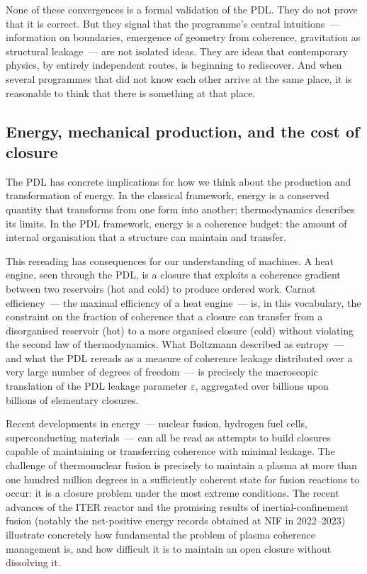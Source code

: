 \documentclass[12pt, a4paper, openright]{book}
\begin{document}
\medskip

None of these convergences is a formal validation of the PDL. They do not prove that it is correct. But they signal that the programme's central intuitions~--- information on boundaries, emergence of geometry from coherence, gravitation as structural leakage~--- are not isolated ideas. They are ideas that contemporary physics, by entirely independent routes, is beginning to rediscover. And when several programmes that did not know each other arrive at the same place, it is reasonable to think that there is something at that place.

\subsection*{Energy, mechanical production, and the cost of closure}

The PDL has concrete implications for how we think about the production and transformation of energy. In the classical framework, energy is a conserved quantity that transforms from one form into another; thermodynamics describes its limits. In the PDL framework, energy is a coherence budget: the amount of internal organisation that a structure can maintain and transfer.

\medskip

This rereading has consequences for our understanding of machines. A heat engine, seen through the PDL, is a closure that exploits a coherence gradient between two reservoirs (hot and cold) to produce ordered work. Carnot efficiency~--- the maximal efficiency of a heat engine~--- is, in this vocabulary, the constraint on the fraction of coherence that a closure can transfer from a disorganised reservoir (hot) to a more organised closure (cold) without violating the second law of thermodynamics. What Boltzmann described as entropy~--- and what the PDL rereads as a measure of coherence leakage distributed over a very large number of degrees of freedom~--- is precisely the macroscopic translation of the PDL leakage parameter $\varepsilon$, aggregated over billions upon billions of elementary closures.

\medskip

Recent developments in energy~--- nuclear fusion, hydrogen fuel cells, superconducting materials~--- can all be read as attempts to build closures capable of maintaining or transferring coherence with minimal leakage. The challenge of thermonuclear fusion is precisely to maintain a plasma at more than one hundred million degrees in a sufficiently coherent state for fusion reactions to occur: it is a closure problem under the most extreme conditions. The recent advances of the ITER reactor and the promising results of inertial-confinement fusion (notably the net-positive energy records obtained at NIF in 2022--2023) illustrate concretely how fundamental the problem of plasma coherence management is, and how difficult it is to maintain an open closure without dissolving it.
\end{document}
